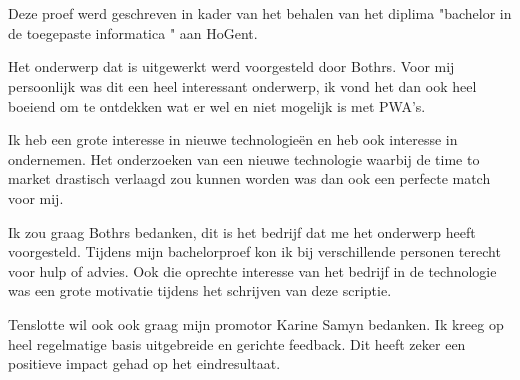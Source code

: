 
\chapter*{}
\label{ch:voorwoord}


Deze proef werd geschreven in kader van het behalen van het diplima "bachelor in de toegepaste informatica " aan HoGent.

Het onderwerp dat is uitgewerkt werd voorgesteld door Bothrs. Voor mij persoonlijk was dit een heel interessant onderwerp, ik vond het dan ook heel boeiend om te ontdekken wat er wel en niet mogelijk is met PWA's.

Ik heb een grote interesse in nieuwe technologieën en heb ook interesse in ondernemen. Het onderzoeken van een nieuwe technologie waarbij de time to market drastisch verlaagd zou kunnen worden was dan ook een perfecte match voor mij. 

Ik zou graag Bothrs bedanken, dit is het bedrijf dat me het onderwerp heeft voorgesteld. Tijdens mijn bachelorproef kon ik bij verschillende personen terecht voor hulp of advies. Ook die oprechte interesse van het bedrijf in de technologie was een grote motivatie tijdens het schrijven van deze scriptie.

Tenslotte wil ook ook graag mijn promotor Karine Samyn bedanken. Ik kreeg op heel regelmatige basis uitgebreide en gerichte feedback. Dit heeft zeker een positieve impact gehad op het eindresultaat.